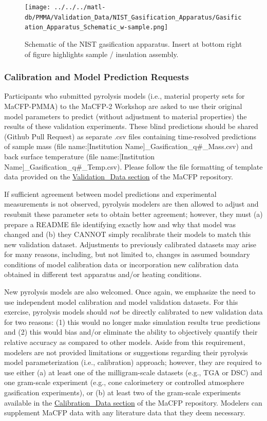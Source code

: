 \documentclass[12pt]{article}
\begin{document}
\begin{figure}
     \centering
         \texttt{[image: ../../../matl-db/PMMA/Validation\_Data/NIST\_Gasification\_Apparatus/Gasification\_Apparatus\_Schematic\_w-sample.png]}
         \caption{ Schematic of the NIST gasification apparatus. Insert at bottom right of figure highlights sample / insulation assembly.}
         \label{fig:NISTGasApp}
\end{figure}

\subsubsection*{Calibration and Model Prediction Requests }
Participants who submitted pyrolysis models (i.e., material property sets for MaCFP-PMMA) to the MaCFP-2 Workshop are asked to use their original model parameters to predict (without adjustment to material properties) the results of these validation experiments. These blind predictions should be shared (Github Pull Request) as separate .csv files containing time-resolved predictions of sample mass (file name:[Institution Name]\_Gasification\_q\#\_Mass.csv) and back surface temperature (file name:[Institution Name]\_Gasification\_q\#\_Temp.csv). Please follow the file formatting of template data provided on the \href{https://github.com/MaCFP/matl-db/tree/master/PMMA/Validation_Data/NIST_Gasification_Apparatus}{Validation\_Data section} of the MaCFP repository.

If sufficient agreement between model predictions and experimental measurements is not observed, pyrolysis modelers are then allowed to adjust and resubmit these parameter sets to obtain better agreement; however, they must (a) prepare a README file identifying exactly how and why that model was changed and (b) they CANNOT simply recalibrate their models to match this new validation dataset.  Adjustments to previously calibrated datasets may arise for many reasons, including,  but not limited to, changes in assumed boundary conditions of model calibration data or incorporation new calibration data obtained in different test apparatus and/or heating conditions.

New pyrolysis models are also welcomed. Once again, we emphasize the need to use independent model calibration and model validation datasets. For this exercise, pyrolysis models should $not$ be directly calibrated to new validation data for two reasons: (1) this would no longer make simulation results true predictions and (2) this would bias and/or eliminate the ability to objectively quantify their relative accuracy as compared to other models. Aside from this requirement, modelers are not provided limitations or suggestions regarding their pyrolysis model parameterization (i.e., calibration) approach; however, they are required to use either (a) at least one of the milligram-scale datasets (e.g., TGA or DSC) and one gram-scale experiment (e.g., cone calorimetery or controlled atmosphere gasification experiments), or (b) at least two of the gram-scale experiments available in the \href{https://github.com/MaCFP/matl-db/tree/master/PMMA/Calibration_Data}{Calibration\_Data section} of the MaCFP repository. Modelers can supplement MaCFP data with any literature data that they deem necessary.
\end{document}
